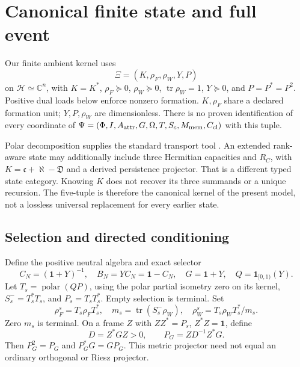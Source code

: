 \documentclass[11pt,letterpaper]{article}
\newcommand{\tr}{\operatorname{tr}}
\newcommand{\pol}{\operatorname{polar}}
\newcommand{\Id}{\mathbf 1}
\newcommand{\C}{\mathbb C}\newcommand{\R}{\mathbb R}
\theoremstyle{definition}
\numberwithin{equation}{section}
\begin{document}
\section{Canonical finite state and full event}
Our finite ambient kernel uses
\begin{equation}\label{Xi}
\Xi=(K,\rho_F,\rho_W,Y,P)
\end{equation}
on $\mathcal H\simeq\C^n$, with $K=K^*$, $\rho_F\succeq0$, $\rho_W\succeq0$, $\tr\rho_W=1$, $Y\succeq0$, and $P=P^*=P^2$. Positive dual loads below enforce nonzero formation. $K,\rho_F$ share a declared formation unit; $Y,P,\rho_W$ are dimensionless. There is no proven identification of every coordinate of $\Psi=(\Phi,I,A_{\rm attr},G,\Omega,T,S_c,M_{\rm mem},C_{\rm cl})$ with this tuple.

Polar decomposition supplies the standard transport tool \cite{higham}. An extended rank-aware state may additionally include three Hermitian capacities and $R_C$, with $K=\mathfrak c+\aleph-\mathfrak D$ and a derived persistence projector. That is a different typed state category. Knowing $K$ does not recover its three summands or a unique recursion. The five-tuple is therefore the canonical kernel of the present model, not a lossless universal replacement for every earlier state.

\subsection{Selection and directed conditioning}
Define the positive neutral algebra and exact selector
\begin{equation}\label{neutralalg}
C_N=(\Id+Y)^{-1},\quad B_N=YC_N=\Id-C_N,\quad G=\Id+Y,\quad Q=\Id_{[0,1)}(Y).
\end{equation}
Let $T_s=\pol(QP)$, using the polar partial isometry zero on its kernel, $S_s^-=T_s^*T_s$, and $P_s=T_sT_s^*$. Empty selection is terminal. Set
\begin{equation}
\rho_F^s=T_s\rho_FT_s^*,\quad m_s=\tr(S_s^-\rho_W),\quad
\rho_W^s=T_s\rho_WT_s^*/m_s.
\end{equation}
Zero $m_s$ is terminal. On a frame $Z$ with $ZZ^*=P_s$, $Z^*Z=\Id$, define
\begin{equation}
D=Z^*GZ>0,\qquad P_G=ZD^{-1}Z^*G.
\end{equation}
Then $P_G^2=P_G$ and $P_G^*G=GP_G$. This metric projector need not equal an ordinary orthogonal or Riesz projector.
\end{document}
